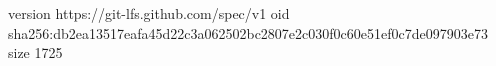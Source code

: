 version https://git-lfs.github.com/spec/v1
oid sha256:db2ea13517eafa45d22c3a062502bc2807e2c030f0c60e51ef0c7de097903e73
size 1725
